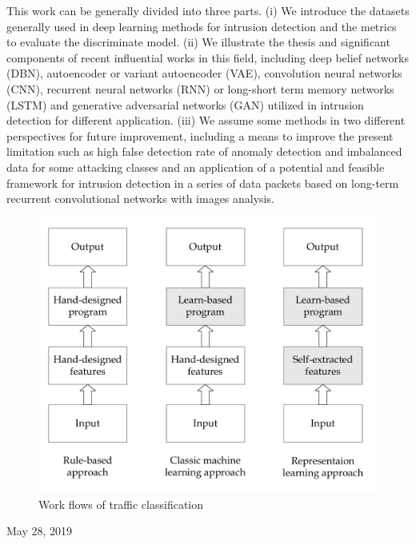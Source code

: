 \documentclass[conference]{IEEEtran}
\begin{document}
This work can be generally divided into three parts. (i) We introduce the datasets generally used in deep learning methods for intrusion detection and the metrics to evaluate the discriminate model. (ii) We illustrate the thesis and significant components of recent influential works in this field, including deep belief networks (DBN), autoencoder or variant autoencoder (VAE), convolution neural networks (CNN), recurrent neural networks (RNN) or long-short term memory networks (LSTM) and generative adversarial networks (GAN) utilized in intrusion detection for different application. (iii) We assume some methods in two different perspectives for future improvement, including a means to improve the  present limitation such as high false detection rate of anomaly detection and imbalanced data for some attacking classes and an application of a potential and feasible framework for intrusion detection in a series of data packets based on long-term recurrent convolutional networks with images analysis. 

\begin{figure}[ht]
\centering
\includegraphics[scale=0.4]{pictures/3m.pdf}
\caption{Work flows of traffic classification}
\label{fig:3m}
\end{figure}

 
\hfill May 28, 2019
\end{document}
